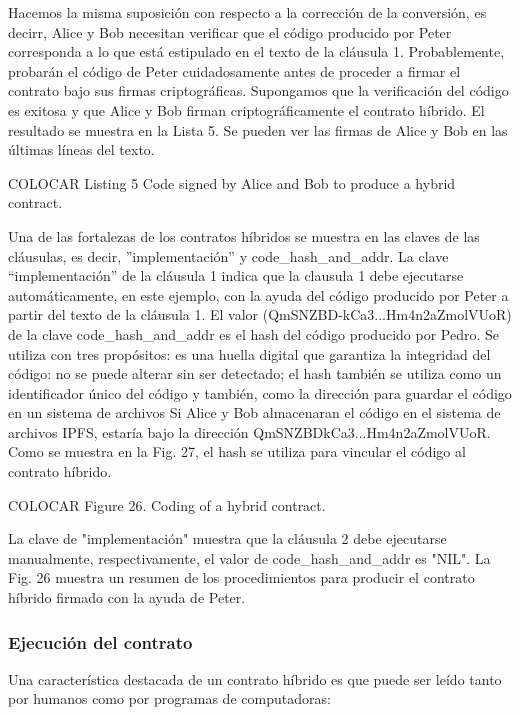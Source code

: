 \documentclass[12pt]{report} %
\begin{document}
\begin{itemize}
Hacemos la misma suposición con respecto a la corrección de la conversión, es decirr, Alice y Bob necesitan verificar que el código producido por Peter corresponda a lo que está estipulado en el texto de la cláusula 1. Probablemente, probarán el código de Peter cuidadosamente antes de proceder a firmar el contrato bajo sus firmas criptográficas. Supongamos que la verificación del código es exitosa y que Alice y Bob firman criptográficamente el contrato híbrido. El resultado se muestra en la Lista 5. Se pueden ver las firmas de Alice y Bob en las últimas líneas del texto.

COLOCAR Listing 5 Code signed by Alice and Bob to produce a hybrid contract.


Una de las fortalezas de los contratos híbridos se muestra en las claves de las cláusulas, es decir, ”implementación” y code\_hash\_and\_addr. La clave “implementación” de la cláusula 1 indica que la clausula 1 debe ejecutarse automáticamente, en este ejemplo, con la ayuda del código producido por Peter a partir del texto de la cláusula 1. El valor (QmSNZBD-kCa3...Hm4n2aZmolVUoR) de la clave code\_hash\_and\_addr es el hash del código producido por Pedro. Se utiliza con tres propósitos: es una huella digital que garantiza la integridad del código: no se puede alterar sin ser detectado; el hash también se utiliza como un identificador único del código y también, como la dirección para guardar el código en un sistema de archivos Si Alice y Bob almacenaran el código en el sistema de archivos IPFS, estaría bajo la dirección QmSNZBDkCa3...Hm4n2aZmolVUoR. Como se muestra en la Fig. 27, el hash se utiliza para vincular el código al contrato híbrido.


COLOCAR Figure 26. Coding of a hybrid contract.

La clave de "implementación" muestra que la cláusula 2 debe ejecutarse manualmente, respectivamente, el valor de code\_hash\_and\_addr es "NIL". La Fig. 26 muestra un resumen de los procedimientos para producir el contrato híbrido firmado con la ayuda de Peter.

\subsubsection{Ejecución del contrato}

Una característica destacada de un contrato híbrido es que puede ser leído tanto por humanos como por programas de computadoras:


\end{itemize}
\end{document}
